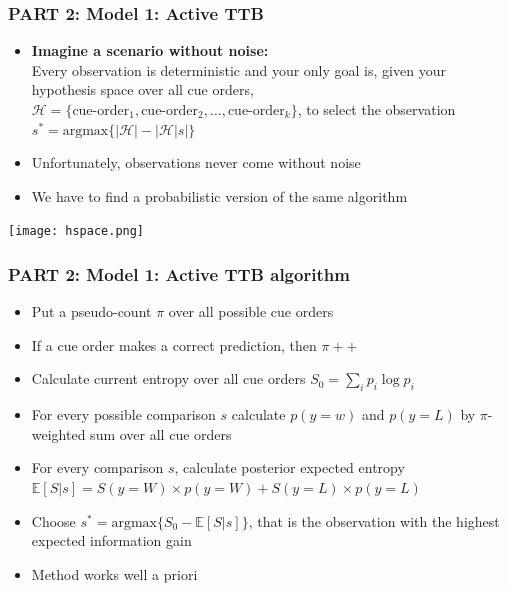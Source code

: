 \documentclass{beamer}
\begin{document}
\begin{frame}
 \frametitle{PART 2: Model 1: Active TTB}
\begin{itemize}
\item \textbf{Imagine a scenario without noise:}\\
Every observation is deterministic and your only goal is, given your hypothesis space over all cue orders, $\mathcal{H}=\{\text{cue-order}_1, \text{cue-order}_2,\dots, \text{cue-order}_k\}$,
to select the observation $s^*=\text{argmax}\{|\mathcal{H}|-|\mathcal{H}|s|\}$ \\
\item Unfortunately, observations never come without noise
\item We have to find a probabilistic version of the same algorithm
\end{itemize}
\begin{center}
\texttt{[image: hspace.png]}
\end{center}
\end{frame}

\begin{frame}
 \frametitle{PART 2: Model 1: Active TTB algorithm}
\begin{itemize}
\item Put a pseudo-count $\pi$ over all possible cue orders
\item If a cue order makes a correct prediction, then $\pi++$
\item Calculate current entropy over all cue orders $S_0=\sum_i p_i \log p_i$
\item For every possible comparison $s$ calculate $p(y=w)$ and $p(y=L)$ by $\pi$-weighted sum over all cue orders
\item For every comparison $s$, calculate posterior expected entropy
$ \mathbb{E}[S|s]=S(y=W) \times p(y=W)+S(y=L) \times p(y=L)$
\item Choose $s^*=\text{argmax} \{S_0-\mathbb{E}[S|s]\}$, that is the observation with the highest expected information gain
\item Method works well a priori
\end{itemize}
\end{frame}
\end{document}
